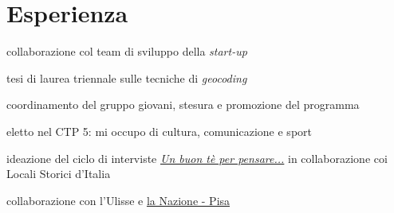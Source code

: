 \documentclass[a4paper]{deedy-resume} %
\begin{document}
\begin{minipage}[t]{0.66\textwidth} %


\section{Esperienza}



\vspace{\topsep} %
\begin{tightitemize}
\item collaborazione col team di sviluppo della \textit{start-up}
\item tesi di laurea triennale sulle tecniche di \textit{geocoding}
\end{tightitemize}

\sectionspace %



\begin{tightitemize}
\item coordinamento del gruppo giovani, stesura e promozione del programma
\item eletto nel CTP 5: mi occupo di cultura, comunicazione e sport
\end{tightitemize}

\sectionspace %



\begin{tightitemize}
\item ideazione del ciclo di interviste \href{http://www.localistorici.it/it/News/view/slug/all-ussero-tornano-gli-incontri-degli-studenti}{\textit{Un buon tè per pensare...}} in collaborazione coi Locali Storici d'Italia
\item collaborazione con l'Ulisse e \href{http://rassegnastampa.unipi.it/rassegna/archivio/2012/02/21SIG2034.PDF}{la Nazione - Pisa}
\end{tightitemize}


\end{minipage}
\end{document}
